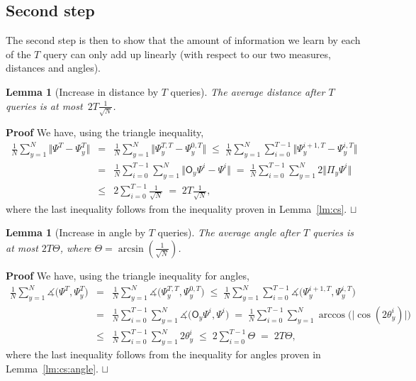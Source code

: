 \documentclass{article}
\newtheorem{lemma}[theorem]{Lemma}
\def\squareforqed{\hbox{\rlap{$\sqcap$}$\sqcup$}}
\def\qed{\ifmmode\squareforqed\else{\unskip\nobreak\hfil
\penalty50\hskip1em\null\nobreak\hfil\squareforqed
\parfillskip=0pt\finalhyphendemerits=0\endgraf}\fi}
\newenvironment{proof}{\begin{trivlist}\item[]{\flushleft\bf Proof }}
{\qed\end{trivlist}}
\newcommand{\op}[1]{\mathsf{#1}}
\newcommand{\proj}{\mathsf{\Pi}}
\begin{document}
\subsection{Second step}
The second step is then to show that the amount of information we
learn by each of the $T$ query can only add up linearly (with respect
to our two measures, distances and angles).

\begin{lemma}[Increase in distance by $T$ queries] 
\label{lm:avgchange}
  The average distance after $T$ queries is at
  most~$2T\frac{1}{\sqrt{N}}$.
\end{lemma}

\begin{proof}
  We have, using the triangle inequality,%
\begin{eqnarray*}
  \frac{1}{N}\sum\limits_{y=1}^{N}
  \big\Vert \Psi^{T} - \Psi^{T}_{y}\big\Vert 
  &=& \frac{1}{N}\sum\limits_{y=1}^{N}
  \big\Vert \Psi^{T,T}_{y} - \Psi^{0,T}_{y}\big\Vert 
  \;\leq\;  \frac{1}{N}\sum\limits_{y=1}^{N} \sum\limits_{i=0}^{T-1}
  \big\Vert \Psi^{i+1,T}_{y} - \Psi^{i,T}_{y}\big\Vert \\
  &=&\frac{1}{N}\sum\limits_{i=0}^{T-1} \sum\limits_{y=1}^{N}
  \big\Vert \op{O}_{y}\Psi^{i} - \Psi^{i}\big\Vert 
  \;=\;  \frac{1}{N}\sum\limits_{i=0}^{T-1} \sum\limits_{y=1}^{N}
  2\big\Vert \proj_y \Psi^{i} \big\Vert \\
  &\leq& 2\sum\limits_{i=0}^{T-1} \frac{1}{\sqrt{N}} 
  \;=\; 2T\frac{1}{\sqrt{N}},
\end{eqnarray*}%
where the last inequality follows from the inequality proven in
Lemma~\ref{lm:cs}.
\end{proof}


\begin{lemma}[Increase in angle by $T$ queries] 
\label{lm:avgchange:angle}
  The average angle after $T$ queries is at most $2T \Theta$, where
  $\Theta = \arcsin(\frac{1}{\sqrt N})$.
\end{lemma}

\begin{proof}
  We have, using the triangle inequality for angles,
\begin{eqnarray*}
  \frac{1}{N}\sum\limits_{y=1}^{N}
  \measuredangle \big( \Psi^{T}, \Psi^{T}_{y} \big) 
  &=& \frac{1}{N}\sum\limits_{y=1}^{N}
  \measuredangle \big( \Psi^{T,T}_{y}, \Psi^{0,T}_{y} \big)
  \;\leq\;  \frac{1}{N}\sum\limits_{y=1}^{N} \sum\limits_{i=0}^{T-1}
  \measuredangle \big( \Psi^{i+1,T}_{y}, \Psi^{i,T}_{y}\big) \\
  &=& \frac{1}{N}\sum\limits_{i=0}^{T-1} \sum\limits_{y=1}^{N}
  \measuredangle \big( \op{O}_{y}\Psi^{i}, \Psi^{i}\big)
  \;=\;  \frac{1}{N}\sum\limits_{i=0}^{T-1} \sum\limits_{y=1}^{N}
  \arccos \big( \big\vert \cos (2\theta_{y}^{i}) \big\vert \big) \\
  &\leq&   \frac{1}{N}\sum\limits_{i=0}^{T-1}\sum\limits_{y=1}^{N} 2\theta_{y}^{i}
  \;\leq\; 2\sum\limits_{i=0}^{T-1} \Theta
  \;=\;    2T\Theta,
\end{eqnarray*}
where the last inequality follows from the inequality for angles
proven in Lemma~\ref{lm:cs:angle}.
\end{proof}
\end{document}
